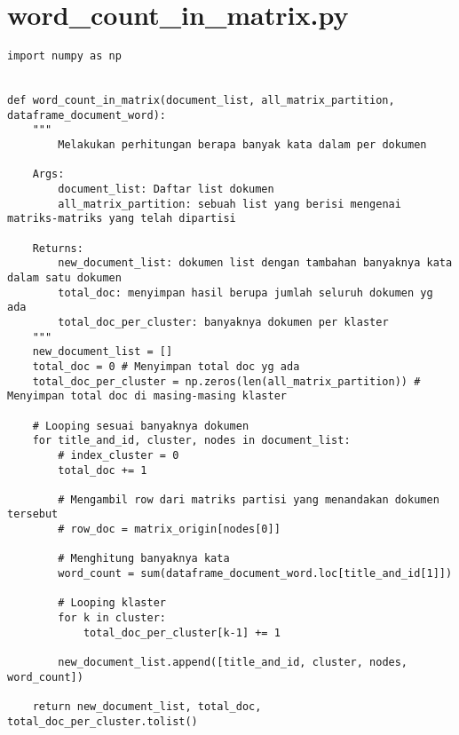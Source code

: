 \chapter{word\_count\_in\_matrix.py}
\begin{lstlisting}[breaklines=true]
import numpy as np


def word_count_in_matrix(document_list, all_matrix_partition, dataframe_document_word):
	"""
		Melakukan perhitungan berapa banyak kata dalam per dokumen

	Args:
		document_list: Daftar list dokumen
		all_matrix_partition: sebuah list yang berisi mengenai matriks-matriks yang telah dipartisi
		
	Returns:
		new_document_list: dokumen list dengan tambahan banyaknya kata dalam satu dokumen
		total_doc: menyimpan hasil berupa jumlah seluruh dokumen yg ada
		total_doc_per_cluster: banyaknya dokumen per klaster 
	"""
	new_document_list = []
	total_doc = 0 # Menyimpan total doc yg ada
	total_doc_per_cluster = np.zeros(len(all_matrix_partition)) # Menyimpan total doc di masing-masing klaster

	# Looping sesuai banyaknya dokumen
	for title_and_id, cluster, nodes in document_list:
		# index_cluster = 0
		total_doc += 1
		
		# Mengambil row dari matriks partisi yang menandakan dokumen tersebut
		# row_doc = matrix_origin[nodes[0]]
		
		# Menghitung banyaknya kata
		word_count = sum(dataframe_document_word.loc[title_and_id[1]])

		# Looping klaster
		for k in cluster:
			total_doc_per_cluster[k-1] += 1
		
		new_document_list.append([title_and_id, cluster, nodes, word_count])
		
	return new_document_list, total_doc, total_doc_per_cluster.tolist()

\end{lstlisting}


